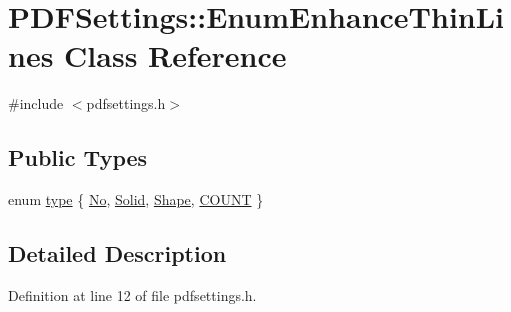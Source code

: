 \hypertarget{classPDFSettings_1_1EnumEnhanceThinLines}{\section{P\+D\+F\+Settings\+:\+:Enum\+Enhance\+Thin\+Lines Class Reference}
\label{classPDFSettings_1_1EnumEnhanceThinLines}
}


{\ttfamily \#include $<$pdfsettings.\+h$>$}

\subsection*{Public Types}
\begin{DoxyCompactItemize}
\item 
enum \hyperlink{classPDFSettings_1_1EnumEnhanceThinLines_a654750972bfae3ed1f24a3c7a26f48d8}{type} \{ \hyperlink{classPDFSettings_1_1EnumEnhanceThinLines_a654750972bfae3ed1f24a3c7a26f48d8a549d2d50af8c8565cc95969502fc15d3}{No}, 
\hyperlink{classPDFSettings_1_1EnumEnhanceThinLines_a654750972bfae3ed1f24a3c7a26f48d8a6ed4b73013058427a1842e0f07b832b0}{Solid}, 
\hyperlink{classPDFSettings_1_1EnumEnhanceThinLines_a654750972bfae3ed1f24a3c7a26f48d8af39e4994f60336bd6fec32185c9367d9}{Shape}, 
\hyperlink{classPDFSettings_1_1EnumEnhanceThinLines_a654750972bfae3ed1f24a3c7a26f48d8a1fd4e5e0147b9d7484a83bd09f472802}{C\+O\+U\+N\+T}
 \}
\end{DoxyCompactItemize}


\subsection{Detailed Description}


Definition at line 12 of file pdfsettings.\+h.



